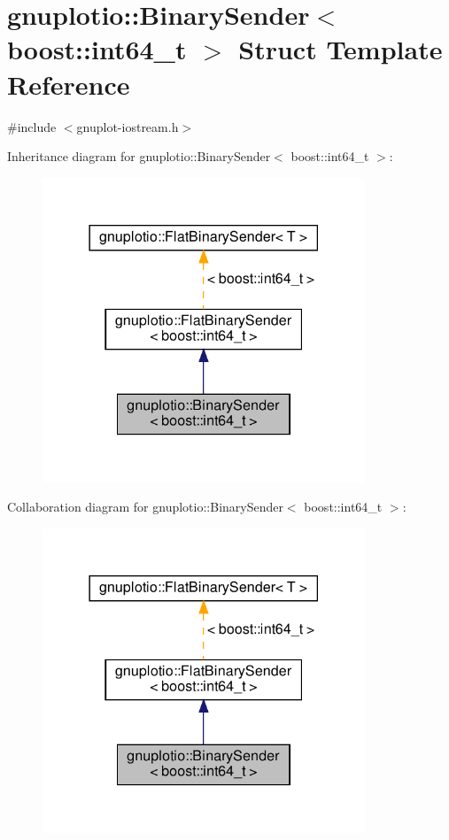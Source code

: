 \hypertarget{structgnuplotio_1_1_binary_sender_3_01boost_1_1int64__t_01_4}{}\section{gnuplotio\+:\+:Binary\+Sender$<$ boost\+:\+:int64\+\_\+t $>$ Struct Template Reference}
\label{structgnuplotio_1_1_binary_sender_3_01boost_1_1int64__t_01_4}


{\ttfamily \#include $<$gnuplot-\/iostream.\+h$>$}



Inheritance diagram for gnuplotio\+:\+:Binary\+Sender$<$ boost\+:\+:int64\+\_\+t $>$\+:
\nopagebreak
\begin{figure}[H]
\begin{center}
\leavevmode
\includegraphics[width=273pt]{structgnuplotio_1_1_binary_sender_3_01boost_1_1int64__t_01_4__inherit__graph}
\end{center}
\end{figure}


Collaboration diagram for gnuplotio\+:\+:Binary\+Sender$<$ boost\+:\+:int64\+\_\+t $>$\+:
\nopagebreak
\begin{figure}[H]
\begin{center}
\leavevmode
\includegraphics[width=273pt]{structgnuplotio_1_1_binary_sender_3_01boost_1_1int64__t_01_4__coll__graph}
\end{center}
\end{figure}
